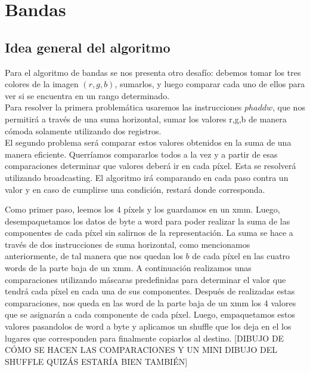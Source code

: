 \documentclass[a4paper]{article}
\begin{document}
\newpage
\section{Bandas}
\subsection{Idea general del algoritmo}
Para el algoritmo de bandas se nos presenta otro desafío: debemos tomar los tres colores de la imagen $(r,g,b)$, sumarlos, y luego comparar cada uno de ellos para ver si se encuentra en un rango determinado.
\\
Para resolver la primera problemática usaremos las instrucciones $phaddw$, que nos permitirá a través de una suma horizontal, sumar los valores r,g,b de manera cómoda solamente utilizando dos registros.
\\
El segundo problema será comparar estos valores obtenidos en la suma de una manera eficiente. Querríamos compararlos todos a la vez y a partir de esas comparaciones determinar que valores deberá ir en cada píxel. Esta se resolverá utilizando broadcasting. El algoritmo irá comparando en cada paso contra un valor y en caso de cumplirse una condición, restará donde corresponda.

Como primer paso, leemos los 4 píxels y los guardamos en un xmm. Luego, desempaquetamos los datos de byte a word para poder realizar la suma de las componentes de cada píxel sin salirnos de la representación. La suma se hace a través de dos instrucciones de suma horizontal, como mencionamos anteriormente, de tal manera que nos quedan los $b$ de cada píxel en las cuatro words de la parte baja de un xmm. A continuación realizamos unas comparaciones utilizando máscaras predefinidas para determinar el valor que tendrá cada píxel en cada una de sus componentes. Después de realizadas estas comparaciones, nos queda en las word de la parte baja de un xmm los 4 valores que se asignarán a cada componente de cada píxel. Luego, empaquetamos estos valores pasandolos de word a byte y aplicamos un shuffle que los deja en el los lugares que corresponden para finalmente copiarlos al destino. [DIBUJO DE CÓMO SE HACEN LAS COMPARACIONES Y UN MINI DIBUJO DEL SHUFFLE QUIZÁS ESTARÍA BIEN TAMBIÉN]
\end{document}
